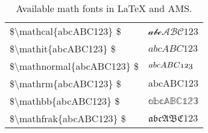 \documentclass[a4paper, 12pt]{report}
\def\tbs{\textbackslash}
\begin{document}
    \begin{table}[h]
        \centering
        \begin{tabular}{>{\ttfamily\$}l<{\$}l}
            \toprule
            \tbs{}mathcal\{abcABC123\}    & $\mathcal{abcABC123}$ \\
            \tbs{}mathit\{abcABC123\}     & $\mathit{abcABC123}$ \\
            \tbs{}mathnormal\{abcABC123\} & $\mathnormal{abcABC123}$ \\
            \tbs{}mathrm\{abcABC123\}     & $\mathrm{abcABC123}$ \\
            \tbs{}mathbb\{abcABC123\}     & $\mathbb{abcABC123}$ \\
            \tbs{}mathfrak\{abcABC123\}   & $\mathfrak{abcABC123}$ \\
            \bottomrule
        \end{tabular}
        \caption{Available math fonts in \LaTeX{} and AMS.}
        \label{tab:math_fonts}
    \end{table}
\end{document}
